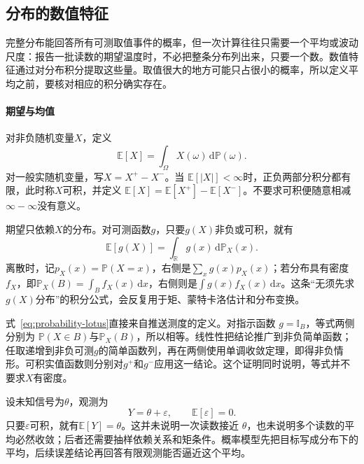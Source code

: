 \subsection{分布的数值特征}
\label{sec:rv-features}

完整分布能回答所有可测取值事件的概率，但一次计算往往只需要一个平均或波动尺度：报告一批读数的期望温度时，不必把整条分布列出来，只要一个数。数值特征通过对分布积分提取这些量。取值很大的地方可能只占很小的概率，所以定义平均之前，要核对相应的积分确实存在。
\label{sec:probability-expectation-conditional-expectation}
\paragraph{期望与均值}
对非负随机变量\(X\)，定义
\[ \mathbb{E}[X]
  =\int_{\Omega}X(\omega)\,\mathrm{d}\mathbb{P}(\omega). \]
对一般实随机变量，写\(X=X^+-X^-\)。当
\(\mathbb{E}[|X|]<\infty\)时，正负两部分积分都有限，此时称\(X\)可积，并定义
\(\mathbb{E}[X]=\mathbb{E}[X^+]-\mathbb{E}[X^-]\)。不要求可积便随意相减\(\infty-\infty\)没有意义。

期望只依赖\(X\)的分布。对可测函数\(g\)，只要\(g(X)\)非负或可积，就有
\begin{equation}
  \mathbb{E}[g(X)]
  =
  \int_{\mathbb{R}}g(x)\,\mathrm{d}\mathbb{P}_X(x).
  \label{eq:probability-lotus}
\end{equation}
离散时，记\(p_X(x)=\mathbb P(X=x)\)，右侧是\(\sum_x g(x)p_X(x)\)；若分布具有密度\(f_X\)，即\(\mathbb P_X(B)=\int_B f_X(x)\,\mathrm dx\)，右侧则是\(\int g(x)f_X(x)\,\mathrm{d}x\)。这条“无须先求\(g(X)\)分布”的积分公式，会反复用于矩、蒙特卡洛估计和分布变换。

式~\eqref{eq:probability-lotus}直接来自推送测度的定义。对指示函数
\(g=\mathbb{I}_B\)，等式两侧分别为
\(\mathbb{P}(X\in B)\)与\(\mathbb{P}_X(B)\)，所以相等。线性性把结论推广到非负简单函数；任取递增到非负可测\(g\)的简单函数列，再在两侧使用单调收敛定理，即得非负情形。可积实值函数则分别对\(g^+\)和\(g^-\)应用这一结论。这个证明同时说明，等式并不要求\(X\)有密度。

\begin{example}[带噪观测的平均目标]
\label{ex:probability-noisy-observation}
设未知信号为\(\theta\)，观测为
\[ Y=\theta+\varepsilon,
  \qquad\mathbb{E}[\varepsilon]=0. \]
只要\(\varepsilon\)可积，就有\(\mathbb{E}[Y]=\theta\)。这并未说明一次读数接近
\(\theta\)，也未说明多个读数的平均必然收敛；后者还需要抽样依赖关系和矩条件。概率模型先把目标写成分布下的平均，后续误差结论再回答有限观测能否逼近这个平均。
\end{example}
